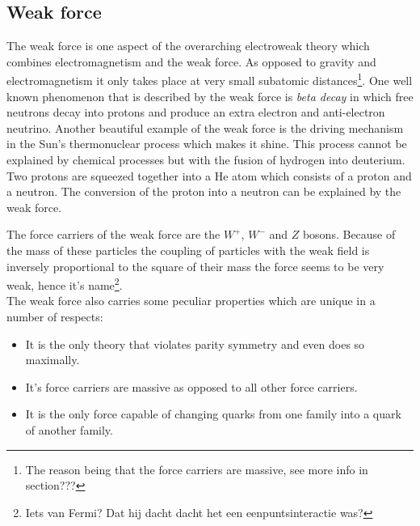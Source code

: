 \subsection*{Weak force}
The weak force is one aspect of the overarching electroweak theory which combines electromagnetism and the weak force. As opposed to gravity and electromagnetism it only takes place at very small subatomic distances\footnote{The reason being that the force carriers are massive, see more info in section???}. One well known phenomenon that is described by the weak force is \textit{beta decay} in which free neutrons decay into protons and produce an extra electron and anti-electron neutrino. Another beautiful example of the weak force is the driving mechanism in the Sun's thermonuclear process which makes it shine. This process cannot be explained by chemical processes but with the fusion of hydrogen into deuterium. Two protons are squeezed together into a He atom which consists of a proton and a neutron. The conversion of the proton into a neutron can be explained by the weak force.

The force carriers of the weak force are the $W^+$, $W^-$ and $Z$ bosons. Because of the mass of these particles the coupling of particles with the weak field is inversely proportional to the square of their mass the force seems to be very weak, hence it's name\footnote{Iets van Fermi?  Dat hij dacht dacht het een eenpuntsinteractie was?}.\\
The weak force also carries some peculiar properties which are unique in a number of respects:
\begin{itemize}
\item It is the only theory that violates parity symmetry and even does so maximally.
\item It's force carriers are massive as opposed to all other force carriers.
\item It is the only force capable of changing quarks from one family into a quark of another family.
\end{itemize}

